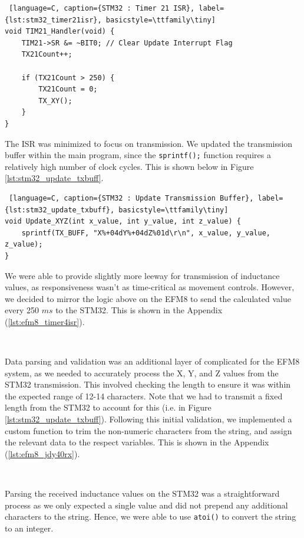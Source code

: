 \documentclass{article}
\begin{document}
\begin{lstlisting} [language=C, caption={STM32 : Timer 21 ISR}, label={lst:stm32_timer21isr}, basicstyle=\ttfamily\tiny]
void TIM21_Handler(void) {
	TIM21->SR &= ~BIT0; // Clear Update Interrupt Flag
	TX21Count++;

	if (TX21Count > 250) {
		TX21Count = 0;
		TX_XY();
	}
}
\end{lstlisting}

The ISR was minimized to focus on transmission. We updated the transmission buffer within the main program, since the \texttt{sprintf();} function requires a relatively high number of clock cycles. This is shown below in Figure \ref{lst:stm32_update_txbuff}.

\begin{lstlisting} [language=C, caption={STM32 : Update Transmission Buffer}, label={lst:stm32_update_txbuff}, basicstyle=\ttfamily\tiny]
void Update_XYZ(int x_value, int y_value, int z_value) {
	sprintf(TX_BUFF, "X%+04dY%+04dZ%01d\r\n", x_value, y_value, z_value);
}
\end{lstlisting}

We were able to provide slightly more leeway for transmission of inductance values, as responsiveness wasn't as time-critical as movement controls. However, we
decided to mirror the logic above on the EFM8 to send the calculated value every 250 $ms$ to the STM32. This is shown in the Appendix (\ref{lst:efm8_timer4isr}).

\

Data parsing and validation was an additional layer of complicated for the EFM8 system, as we needed to accurately process the X, Y, and Z values from
the STM32 transmission. This involved checking the length to ensure it was within the expected range of 12-14 characters. Note that we had to transmit a fixed length from the
STM32 to account for this (i.e. in Figure \ref{lst:stm32_update_txbuff}). Following this initial validation, we implemented a custom function to trim the non-numeric characters from the string, and assign the relevant data
to the respect variables. This is shown in the Appendix (\ref{lst:efm8_jdy40rx}).

\

Parsing the received inductance values on the STM32 was a straightforward process as we only expected a single value and did not prepend any additional characters to the string.
Hence, we were able to use \texttt{atoi()} to convert the string to an integer.

\
\end{document}
